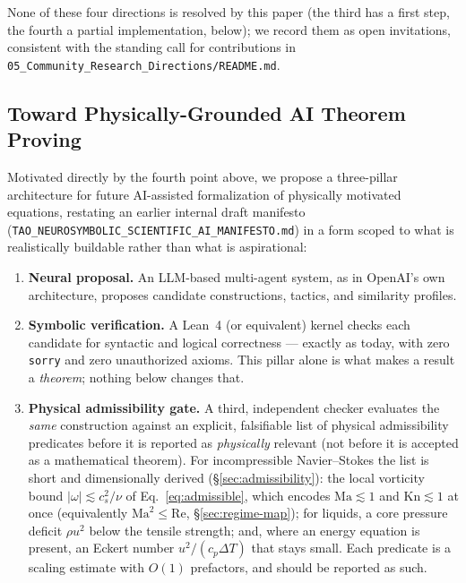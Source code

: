 \documentclass[11pt,a4paper]{article}
\begin{document}
None of these four directions is resolved by this paper (the third has a first step, the fourth a
partial implementation, below); we record them as open invitations,
consistent with the standing call for contributions in
\texttt{05\_Community\_Research\_Directions/README.md}.

\subsection{Toward Physically-Grounded AI Theorem Proving}
\label{sec:architecture}

Motivated directly by the fourth point above, we propose a three-pillar architecture for future
AI-assisted formalization of physically motivated equations, restating an earlier internal draft
manifesto (\texttt{TAO\_NEUROSYMBOLIC\_SCIENTIFIC\_AI\_MANIFESTO.md}) in a form scoped to what is
realistically buildable rather than what is aspirational:

\begin{enumerate}
  \item \textbf{Neural proposal.} An LLM-based multi-agent system, as in OpenAI's own
        architecture, proposes candidate constructions, tactics, and similarity profiles.
  \item \textbf{Symbolic verification.} A Lean~4 (or equivalent) kernel checks each candidate for
        syntactic and logical correctness --- exactly as today, with zero \texttt{sorry} and zero
        unauthorized axioms. This pillar alone is what makes a result a \emph{theorem}; nothing
        below changes that.
  \item \textbf{Physical admissibility gate.} A third, independent checker evaluates the
        \emph{same} construction against an explicit, falsifiable list of physical admissibility
        predicates before it is reported as \emph{physically} relevant (not before it is accepted
        as a mathematical theorem). For incompressible Navier--Stokes the list is short and
        dimensionally derived (\S\ref{sec:admissibility}): the local vorticity bound
        $|\omega|\lesssim c_s^2/\nu$ of Eq.~\eqref{eq:admissible}, which encodes
        $\mathrm{Ma}\lesssim1$ and $\mathrm{Kn}\lesssim1$ at once (equivalently
        $\mathrm{Ma}^2\le\mathrm{Re}$, \S\ref{sec:regime-map}); for liquids, a core pressure
        deficit $\rho u^2$ below the tensile strength; and, where an energy equation is present,
        an Eckert number $u^2/(c_p\Delta T)$ that stays small. Each predicate is a scaling
        estimate with $O(1)$ prefactors, and should be reported as such.
\end{enumerate}
\end{document}
